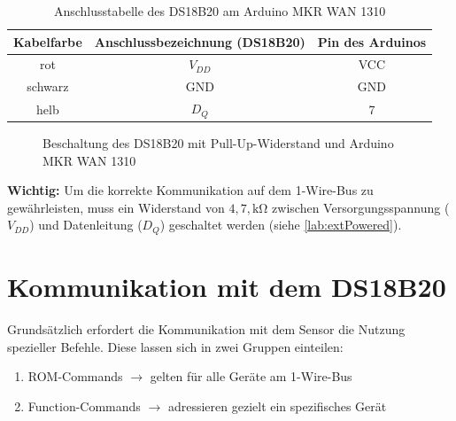 	
	\begin{table}[H]
		\centering
		\begin{tabular}{|c|c|c|}
			\hline
			\textbf{Kabelfarbe} & \textbf{Anschlussbezeichnung (DS18B20)} & \textbf{Pin des Arduinos} \\
			\hline
			rot & $V_{DD} $ & VCC \\
			\hline
			schwarz & GND & GND \\
			\hline
			helb & $D_Q$ & 7 \\
			\hline
		\end{tabular}
		\caption{Anschlusstabelle des DS18B20 am Arduino MKR WAN 1310}
		\label{tab:dsConnectionTable}
	\end{table}
	
	
	\begin{figure}[H]
	\centering
	\caption{Beschaltung des DS18B20 mit Pull-Up-Widerstand und Arduino MKR WAN 1310}
	\label{fig:dsCircuit}
\end{figure}

\textbf{Wichtig:} Um die korrekte Kommunikation auf dem 1-Wire-Bus zu gewährleisten, muss ein Widerstand von $4{,}7,\mathrm{k\Omega}$ zwischen Versorgungsspannung ($V_{DD}$) und Datenleitung ($D_Q$) geschaltet werden (siehe \autoref{lab:extPowered}).

\section{Kommunikation mit dem DS18B20}
	Grundsätzlich erfordert die Kommunikation mit dem Sensor die Nutzung spezieller Befehle. Diese lassen sich in zwei Gruppen einteilen:
	\begin{enumerate}
		\item ROM-Commands $\rightarrow$ gelten für alle Geräte am 1-Wire-Bus
		\item Function-Commands $\rightarrow$ adressieren gezielt ein spezifisches Gerät 
	\end{enumerate}
	
